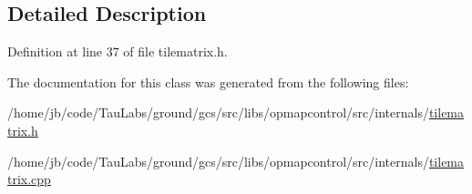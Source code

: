 \subsection{\-Detailed \-Description}


\-Definition at line 37 of file tilematrix.\-h.



\-The documentation for this class was generated from the following files\-:\begin{DoxyCompactItemize}
\item 
/home/jb/code/\-Tau\-Labs/ground/gcs/src/libs/opmapcontrol/src/internals/\hyperlink{tilematrix_8h}{tilematrix.\-h}\item 
/home/jb/code/\-Tau\-Labs/ground/gcs/src/libs/opmapcontrol/src/internals/\hyperlink{tilematrix_8cpp}{tilematrix.\-cpp}\end{DoxyCompactItemize}
